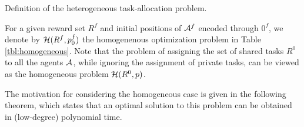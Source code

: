 \documentclass[conference]{IEEEtran}
\begin{document}
\begin{table}[!ht]
\label{tbl:homogeneous}
\noindent{}
\vspace{5pt}
\caption{Definition of the heterogeneous task-allocation problem.}
\end{table}

For a given reward set $R^f$ and initial positions of $\mathcal{A}^f$ encoded through $0^f$, we denote by  $\mathcal{H}(R^f, p_0^f)$ the homogenenous optimization problem in Table \ref{tbl:homogeneous}.%
Note that the problem of assigning the set of shared tasks $R^0$ to all the agents $\mathcal{A}$, while ignoring the assignment of private tasks, can be viewed as the homogeneous problem $\mathcal{H}(R^0,p)$.
 
The motivation for considering the homogeneous case is given in the following theorem, which states that an optimal solution to this problem can be obtained in (low-degree) polynomial time.
\end{document}
